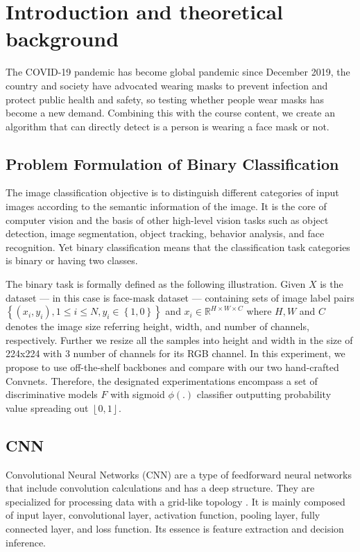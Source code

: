 \documentclass[conference]{IEEEtran}
\begin{document}

\section{Introduction and theoretical background}

The COVID-19 pandemic has become global pandemic since December 2019, the country and society have advocated wearing masks to prevent infection and protect public health and safety, so testing whether people wear masks has become a new demand. Combining this with the course content, we create an algorithm that can directly detect is a person is wearing a face mask or not.





\subsection{Problem Formulation of Binary Classification}
The image classification objective is to distinguish different categories of input images according to the semantic information of the image. It is the core of computer vision and the basis of other high-level vision tasks such as object detection, image segmentation, object tracking, behavior analysis, and face recognition. Yet binary classification means that the classification task categories is binary or having two classes.

The binary task is formally defined as the following illustration. Given $X$ is the dataset --- in this case is face-mask dataset --- containing sets of image label pairs $\left \{ \left ( x_{i},y_{i}  \right ), 1\leq i\leq N, y_{i} \in \left \{ 1,0 \right \} \right \}$ and $x_{i} \in \mathbb{R} ^ {H \times W \times C}$ where $H, W$ and $C$ denotes the image size referring height, width, and number of channels, respectively. Further we resize all the samples into height and width in the size of 224x224 with 3 number of channels for its RGB channel.  In this experiment, we propose to use off-the-shelf backbones and compare with our two hand-crafted Convnets. Therefore, the designated experimentations encompass a set of discriminative models $F$ with sigmoid $\phi(.)$ classifier outputting probability value spreading out $\left \lfloor 0,1 \right \rfloor$. 



\subsection{CNN}
Convolutional Neural Networks (CNN) are a type of feedforward neural networks that include convolution calculations and has a deep structure. They are specialized for processing data with a grid-like topology \cite{goodfellow-deep}. It is mainly composed of input layer, convolutional layer, activation function, pooling layer, fully connected layer, and loss function. Its essence is feature extraction and decision inference. 
\end{document}
